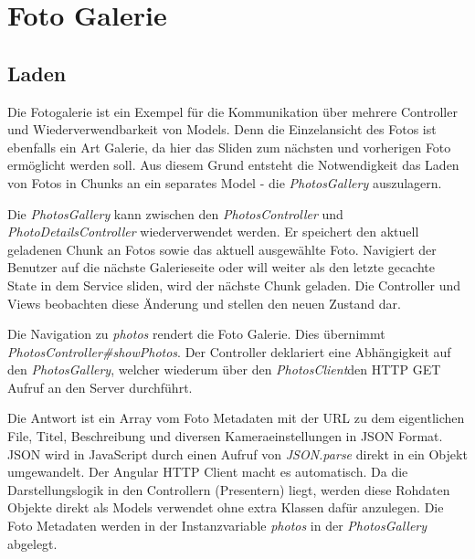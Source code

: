 \section{Foto Galerie}
\label{sec:photo_gallery}

\subsection{Laden}

Die Fotogalerie ist ein Exempel für die Kommunikation über mehrere Controller und Wiederverwendbarkeit von Models. Denn die Einzelansicht des Fotos ist ebenfalls ein Art Galerie, da hier das Sliden zum nächsten und vorherigen Foto ermöglicht werden soll. Aus diesem Grund entsteht die Notwendigkeit das Laden von Fotos in Chunks an ein separates Model - die \textit{PhotosGallery} auszulagern. 

Die \textit{PhotosGallery} kann zwischen den \textit{PhotosController} und \textit{PhotoDetailsController} wiederverwendet werden. Er speichert den aktuell geladenen Chunk an Fotos sowie das aktuell ausgewählte Foto. Navigiert der Benutzer auf die nächste Galerieseite oder will weiter als den letzte gecachte State in dem Service sliden, wird der nächste Chunk geladen. Die Controller und Views beobachten diese Änderung und stellen den neuen Zustand dar.

Die Navigation zu \textit{\/photos} rendert die Foto Galerie. Dies übernimmt  \textit{PhotosController\#showPhotos}. Der Controller deklariert eine Abhängigkeit auf den \textit{PhotosGallery}, welcher wiederum über den \textit{PhotosClient}den HTTP GET Aufruf an den Server durchführt. 

Die Antwort ist ein Array vom Foto Metadaten mit der URL zu dem eigentlichen File, Titel, Beschreibung und diversen Kameraeinstellungen in JSON Format. JSON wird in JavaScript durch einen Aufruf von \textit{JSON.parse} direkt in ein Objekt umgewandelt. Der Angular HTTP Client macht es automatisch. Da die Darstellungslogik in den Controllern (Presentern) liegt, werden diese Rohdaten Objekte direkt als Models verwendet ohne extra Klassen dafür anzulegen. Die Foto Metadaten werden in der Instanzvariable \textit{photos} in der \textit{PhotosGallery} abgelegt. 


